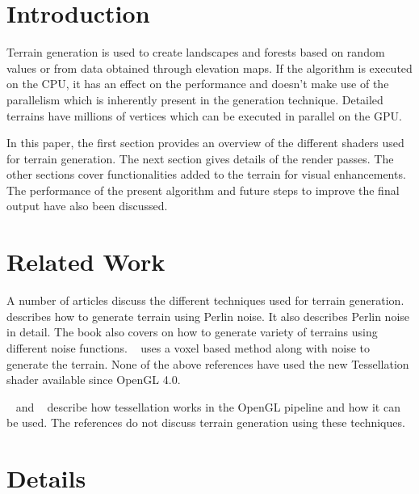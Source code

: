 \documentclass[annual]{acmsiggraph}
\begin{document}

\keywordlist

\TOGlinkslist

\copyrightspace

\section{Introduction}

Terrain generation is used to create landscapes and forests based on random values or from data obtained through elevation maps. If the algorithm is executed on the CPU, it has an effect on the performance and doesn't make use of the parallelism which is inherently present in the generation technique. Detailed terrains have millions of vertices which can be executed in parallel on the GPU.

In this paper, the first section provides an overview of the different shaders used for terrain generation. The next section gives details of the render passes. The other sections cover functionalities added to the terrain for visual enhancements. The performance of the present algorithm and future steps to improve the final output have also been discussed.

\section{Related Work}
A number of articles discuss the different techniques used for terrain generation. ~\cite{Ebert:2003} describes how to generate terrain using Perlin noise. It also describes Perlin noise in detail. The book also covers on how to generate variety of terrains using different noise functions. ~\cite{GPUGems3:2007} uses a voxel based method along with noise to generate the terrain. None of the above references have used the new Tessellation shader available since OpenGL 4.0.

~\cite{openglInsights:2012} and ~\cite{grasshopper:2010} describe how tessellation works in the OpenGL pipeline and how it can be used. The references do not discuss terrain generation using these techniques.

\section{Details}
\end{document}
